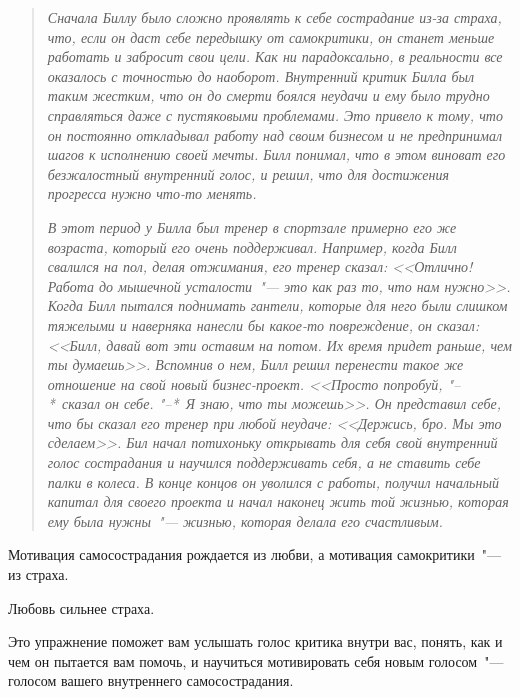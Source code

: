 \begin{quotation}
	\textit{Сначала Биллу было сложно проявлять к себе сострадание из-за страха, что, если он даст себе передышку от самокритики, он станет меньше работать и забросит свои цели. Как ни парадоксально, в реальности все оказалось с точностью до наоборот. Внутренний критик Билла был таким жестким, что он до смерти боялся неудачи и ему было трудно справляться даже с пустяковыми проблемами. Это привело к тому, что он постоянно откладывал работу над своим бизнесом и не предпринимал шагов к исполнению своей мечты. Билл понимал, что в этом виноват его безжалостный внутренний голос, и решил, что для достижения прогресса нужно что-то менять.}
	
	\textit{В этот период у Билла был тренер в спортзале примерно его же возраста, который его очень поддерживал. Например, когда Билл свалился на пол, делая отжимания, его тренер сказал: <<Отлично! Работа до мышечной усталости~"--- это как раз то, что нам нужно>>. Когда Билл пытался поднимать гантели, которые для него были слишком тяжелыми и наверняка нанесли бы какое-то повреждение, он сказал: <<Билл, давай вот эти оставим на потом. Их время придет раньше, чем ты думаешь>>. Вспомнив о нем, Билл решил перенести такое же отношение на свой новый бизнес-проект. <<Просто попробуй, "--*~сказал он себе. "--*~Я знаю, что ты можешь>>. Он представил себе, что бы сказал его тренер при любой неудаче: <<Держись, бро. Мы это сделаем>>. Бил начал потихоньку открывать для себя свой внутренний голос сострадания и научился поддерживать себя, а не ставить себе палки в колеса. В конце концов он уволился с работы, получил начальный капитал для своего проекта и начал наконец жить той жизнью, которая ему была нужны~"--- жизнью, которая делала его счастливым.}
\end{quotation}

\vspace{4ex}

\begin{center}
	{\Large Мотивация самосострадания рождается из любви, а мотивация самокритики~"--- из страха.}
	
	\vspace{1ex}
	
	{\Large	Любовь сильнее страха.}
\end{center}

\newpage
{} \label{EX:Finding_Your_Compassionate_Voice}

Это упражнение поможет вам услышать голос критика внутри вас, понять, как и чем он пытается вам помочь, и научиться мотивировать себя новым голосом~"--- голосом вашего внутреннего самосострадания. 

